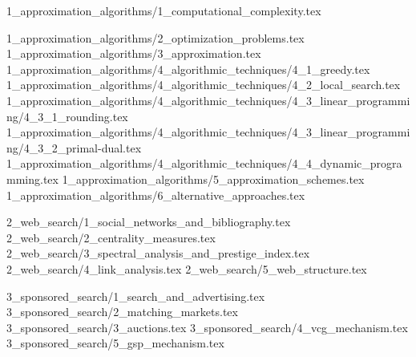 \documentclass{article}
\begin{document}
	\tableofcontents

	{1_approximation_algorithms/1_computational_complexity.tex}

	{1_approximation_algorithms/2_optimization_problems.tex}
	{1_approximation_algorithms/3_approximation.tex}
	{1_approximation_algorithms/4_algorithmic_techniques/4_1_greedy.tex}
	{1_approximation_algorithms/4_algorithmic_techniques/4_2_local_search.tex}
	{1_approximation_algorithms/4_algorithmic_techniques/4_3_linear_programming/4_3_1_rounding.tex}
	{1_approximation_algorithms/4_algorithmic_techniques/4_3_linear_programming/4_3_2_primal-dual.tex}
	{1_approximation_algorithms/4_algorithmic_techniques/4_4_dynamic_programming.tex}
	{1_approximation_algorithms/5_approximation_schemes.tex}
	{1_approximation_algorithms/6_alternative_approaches.tex}

	{2_web_search/1_social_networks_and_bibliography.tex}
	{2_web_search/2_centrality_measures.tex}
	{2_web_search/3_spectral_analysis_and_prestige_index.tex}
	{2_web_search/4_link_analysis.tex}
	{2_web_search/5_web_structure.tex}

	{3_sponsored_search/1_search_and_advertising.tex}
	{3_sponsored_search/2_matching_markets.tex}
	{3_sponsored_search/3_auctions.tex}
	{3_sponsored_search/4_vcg_mechanism.tex}
	{3_sponsored_search/5_gsp_mechanism.tex}
\end{document}
